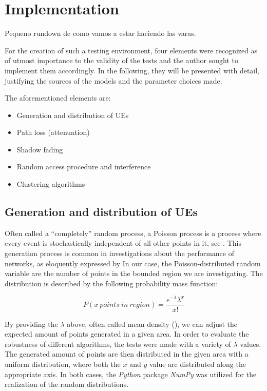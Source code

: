\chapter{Implementation} \label{Implementation}

Pequeno rundown de como vamos a estar haciendo las varas.

For the creation of such a testing environment, four elements were recognized as of utmost importance to the validity of the tests and the author sought to implement them accordingly. In the following, they will be presented with detail, justifying the sources of the models and the parameter choices made.

The aforementioned elements are:

\begin{itemize}
	\item Generation and distribution of UEs %
	\item Path loss (attenuation) %
	\item Shadow fading %
	\item Random access procedure and interference %
  \item Clustering algorithms
\end{itemize}

\section{Generation and distribution of UEs} \label{PPP}
Often called a ``completely'' random process, a Poisson process is a process where every event is stochastically independent of all other points in it, see \cite{Keeler2016}. This generation process is common in investigations about the performance of networks, as eloquently expressed by \cite{Keeler} In our case, the Poisson-distributed random variable are the number of points in the bounded region we are investigating. The distribution is described by the following probability mass function:

\begin{equation} \label{eq:Poisson}
P\left( x\ points\ in\ region \right) = \frac{{e^{ - \lambda } \lambda ^x }}{{x!}}
\end{equation}

By providing the $\lambda$ above, often called mean density (\cite{Keeler2016}), we can adjust the expected amount of points generated in a given area. In order to evaluate the robustness of different algorithms, the tests were made with a variety of $\lambda$ values. The generated amount of points are then distributed in the given area with a uniform distribution, where both the $x$ and $y$ value are distributed along the appropriate axis. In both cases, the \textit{Python} package \textit{NumPy} was utilized for the realization of the random distributions.

